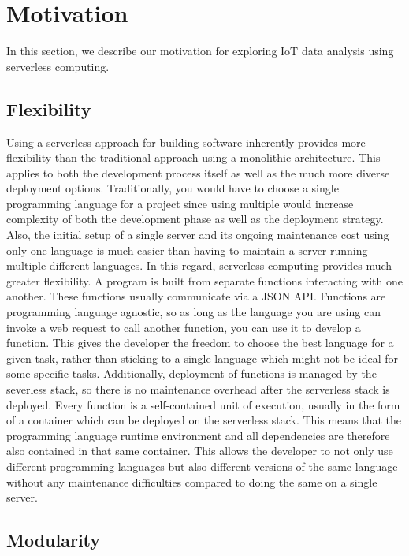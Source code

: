 \section{Motivation}

In this section, we describe our motivation for exploring IoT data analysis using serverless
computing.


\subsection{Flexibility}

Using a serverless approach for building software inherently provides more flexibility than the
traditional approach using a monolithic architecture. This applies to both the development process
itself as well as the much more diverse deployment options. Traditionally, you would have to choose
a single programming language for a project since using multiple would increase complexity of both
the development phase as well as the deployment strategy. Also, the initial setup of a single server
and its ongoing maintenance cost using only one language is much easier than having to maintain a
server running multiple different languages. In this regard, serverless computing provides much
greater flexibility. A program is built from separate functions interacting with one another. These
functions usually communicate via a JSON API. Functions are programming language agnostic, so as
long as the language you are using can invoke a web request to call another function, you can use it
to develop a function. This gives the developer the freedom to choose the best language for a given
task, rather than sticking to a single language which might not be ideal for some specific tasks.
Additionally, deployment of functions is managed by the severless stack, so there is no maintenance
overhead after the serverless stack is deployed. Every function is a self-contained unit of
execution, usually in the form of a container which can be deployed on the serverless stack. This
means that the programming language runtime environment and all dependencies are therefore also
contained in that same container. This allows the developer to not only use different programming
languages but also different versions of the same language without any maintenance difficulties
compared to doing the same on a single server.

\subsection{Modularity}

